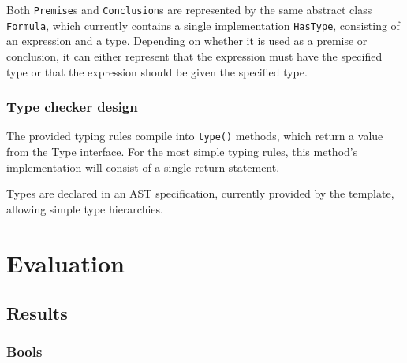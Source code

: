 \documentclass[nofilelist]{cslthse-msc}
\begin{document}
Both \verb|Premise|s and \verb|Conclusion|s are represented by the same abstract class \verb|Formula|, which currently contains a single implementation \verb|HasType|, consisting of an expression and a type.
Depending on whether it is used as a premise or conclusion, it can either represent that the expression must have the specified type or that the expression should be given the specified type.

\subsection{Type checker design}
The provided typing rules compile into \verb|type()| methods, which return a value from the Type interface.
For the most simple typing rules, this method's implementation will consist of a single return statement.

Types are declared in an AST specification, currently provided by the template, allowing simple type hierarchies.


\chapter{Evaluation} %
\section{Results} %
\subsection{Bools}
\end{document}
